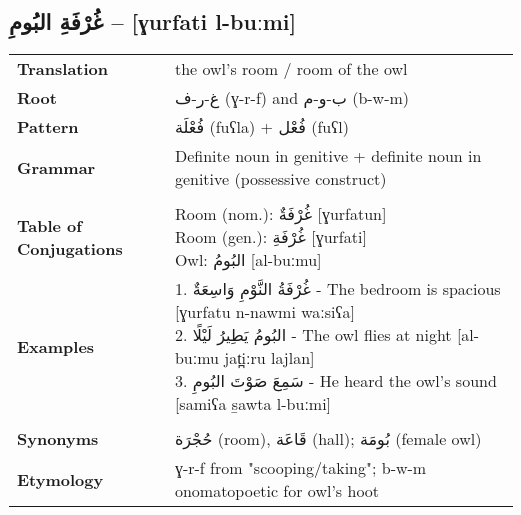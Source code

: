 \documentclass[letter,12pt]{article}
\begin{document}
\subsection{\textarabic{غُرْفَةِ البُومِ} – [ɣurfati l-buːmi]}
\begin{tabular}{p{3cm}p{10cm}}
\toprule
\textbf{Translation} & the owl's room / room of the owl \\
\textbf{Root} & \textarabic{غ-ر-ف} (ɣ-r-f) and \textarabic{ب-و-م} (b-w-m) \\
\textbf{Pattern} & \textarabic{فُعْلَة} (fuʕla) + \textarabic{فُعْل} (fuʕl) \\
\textbf{Grammar} & Definite noun in genitive + definite noun in genitive (possessive construct) \\
\midrule \\
\textbf{Table of Conjugations} & \makecell[l]{
Room (nom.): \textarabic{غُرْفَةٌ} [ɣurfatun] \\
Room (gen.): \textarabic{غُرْفَةِ} [ɣurfati] \\
Owl: \textarabic{البُومُ} [al-buːmu]
} \\
\midrule
\textbf{Examples} & \makecell[l]{\parbox{9.5cm}{
1. \textarabic{غُرْفَةُ النَّوْمِ وَاسِعَةٌ} - The bedroom is spacious [ɣurfatu n-nawmi waːsiʕa]\\
2. \textarabic{البُومُ يَطِيرُ لَيْلًا} - The owl flies at night [al-buːmu jat̪iːru lajlan]\\
3. \textarabic{سَمِعَ صَوْتَ البُومِ} - He heard the owl's sound [samiʕa s̱awta l-buːmi]
}} \\
\midrule \\
\textbf{Synonyms} & \textarabic{حُجْرَة} (room), \textarabic{قَاعَة} (hall); \textarabic{بُومَة} (female owl) \\
\textbf{Etymology} & ɣ-r-f from "scooping/taking"; b-w-m onomatopoetic for owl's hoot \\
\bottomrule
\end{tabular}
\end{document}

